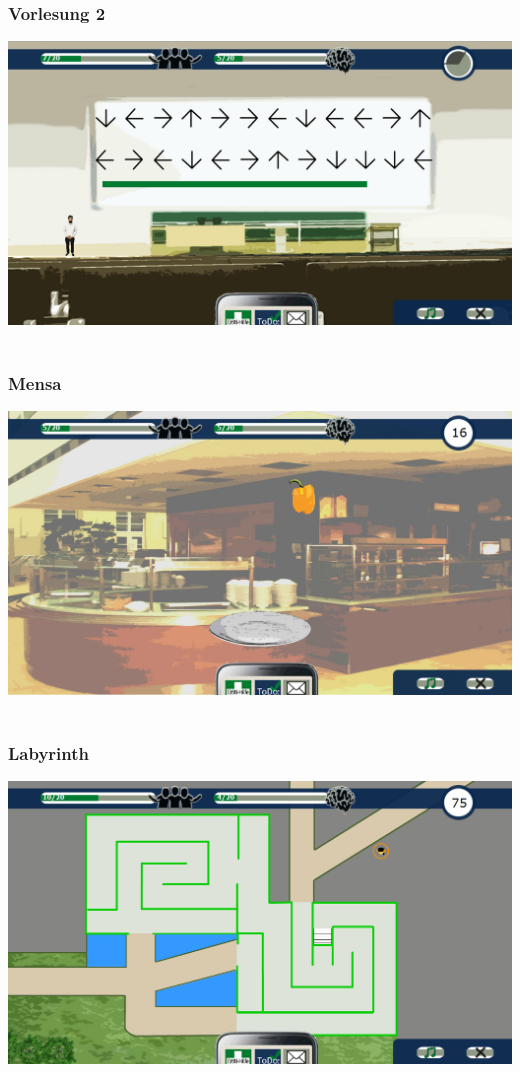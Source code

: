 \documentclass[a4paper, 11pt]{article} %
\begin{document}
\subsubsection{Vorlesung 2}
\includegraphics[scale=0.5]{images/spiel/vorlesung2.png}\\\\
\subsubsection{Mensa}
\includegraphics[scale=0.5]{images/spiel/mensa.png}\\\\
\subsubsection{Labyrinth}
\includegraphics[scale=0.5]{images/spiel/labyrinth.png}\\\\
\end{document}
